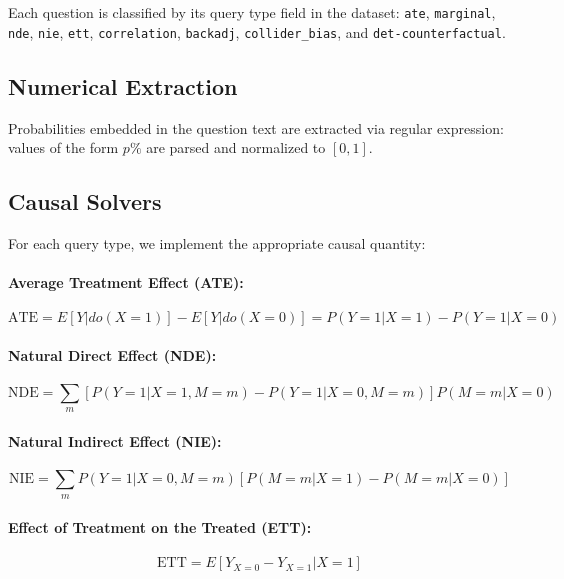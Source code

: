 \documentclass[11pt]{article}
\begin{document}
Each question is classified by its query type field in the dataset:
\texttt{ate}, \texttt{marginal}, \texttt{nde}, \texttt{nie},
\texttt{ett}, \texttt{correlation}, \texttt{backadj},
\texttt{collider\_bias}, and \texttt{det-counterfactual}.

\subsection{Numerical Extraction}

Probabilities embedded in the question text are extracted via regular
expression: values of the form $p\%$ are parsed and normalized to $[0,1]$.

\subsection{Causal Solvers}

For each query type, we implement the appropriate causal quantity:

\paragraph{Average Treatment Effect (ATE):}
\begin{equation}
\text{ATE} = E[Y | do(X=1)] - E[Y | do(X=0)] = P(Y=1|X=1) - P(Y=1|X=0)
\end{equation}

\paragraph{Natural Direct Effect (NDE):}
\begin{equation}
\text{NDE} = \sum_m \left[ P(Y=1|X=1,M=m) - P(Y=1|X=0,M=m) \right] P(M=m|X=0)
\end{equation}

\paragraph{Natural Indirect Effect (NIE):}
\begin{equation}
\text{NIE} = \sum_m P(Y=1|X=0,M=m) \left[ P(M=m|X=1) - P(M=m|X=0) \right]
\end{equation}

\paragraph{Effect of Treatment on the Treated (ETT):}
\begin{equation}
\text{ETT} = E[Y_{X=0} - Y_{X=1} | X=1]
\end{equation}
\end{document}
